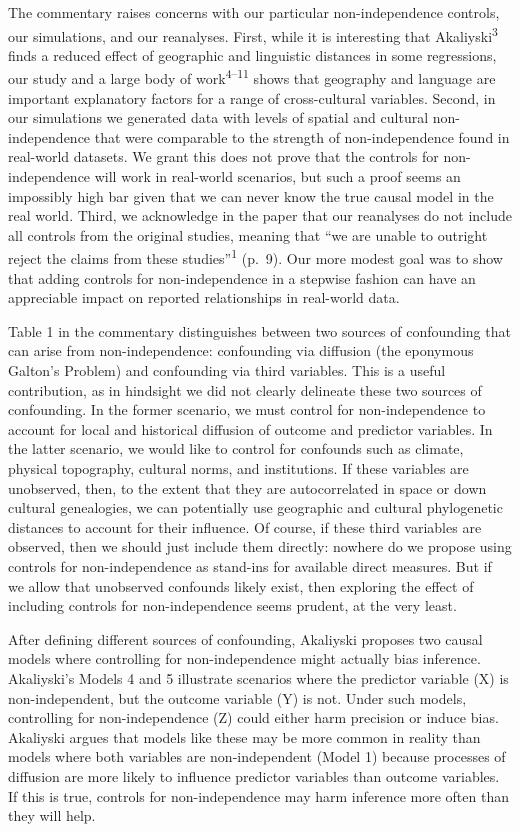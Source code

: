 \documentclass[
  man, donotrepeattitle,floatsintext]{apa6}
\begin{document}
The commentary raises concerns with our particular non-independence controls,
our simulations, and our reanalyses. First, while it is interesting that
Akaliyski\textsuperscript{3} finds a reduced effect of geographic and linguistic
distances in some regressions, our study and a large body of work\textsuperscript{4--11} shows that geography and language are important
explanatory factors for a range of cross-cultural variables. Second, in our
simulations we generated data with levels of spatial and cultural
non-independence that were comparable to the strength of non-independence
found in real-world datasets. We grant this does not prove that the controls
for non-independence will work in real-world scenarios, but such a proof
seems an impossibly high bar given that we can never know the true causal
model in the real world. Third, we acknowledge in the paper that our
reanalyses do not include all controls from the original studies, meaning
that ``we are unable to outright reject the claims from these studies''\textsuperscript{1} (p.~9). Our more modest goal was to show that adding
controls for non-independence in a stepwise fashion can have an appreciable
impact on reported relationships in real-world data.

Table 1 in the commentary distinguishes between two sources of
confounding that can arise from non-independence: confounding via diffusion
(the eponymous Galton's Problem) and confounding via third variables. This
is a useful contribution, as in hindsight we did not clearly delineate these
two sources of confounding. In the former scenario, we must control for
non-independence to account for local and historical diffusion of outcome
and predictor variables. In the latter scenario, we would like to control
for confounds such as climate, physical topography, cultural norms, and
institutions. If these variables are unobserved, then, to the extent that
they are autocorrelated in space or down cultural genealogies, we can
potentially use geographic and cultural phylogenetic distances to account
for their influence. Of course, if these third variables are observed, then
we should just include them directly: nowhere do we propose using controls
for non-independence as stand-ins for available direct measures. But if we
allow that unobserved confounds likely exist, then exploring the effect of
including controls for non-independence seems prudent, at the very least.

After defining different sources of confounding, Akaliyski proposes two
causal models where controlling for non-independence might actually bias
inference. Akaliyski's Models 4 and 5 illustrate scenarios where the predictor
variable (X) is non-independent, but the outcome variable (Y) is not. Under
such models, controlling for non-independence (Z) could either harm precision
or induce bias. Akaliyski argues that models like these may be more common
in reality than models where both variables are non-independent (Model 1)
because processes of diffusion are more likely to influence predictor
variables than outcome variables. If this is true, controls for
non-independence may harm inference more often than they will help.
\end{document}
